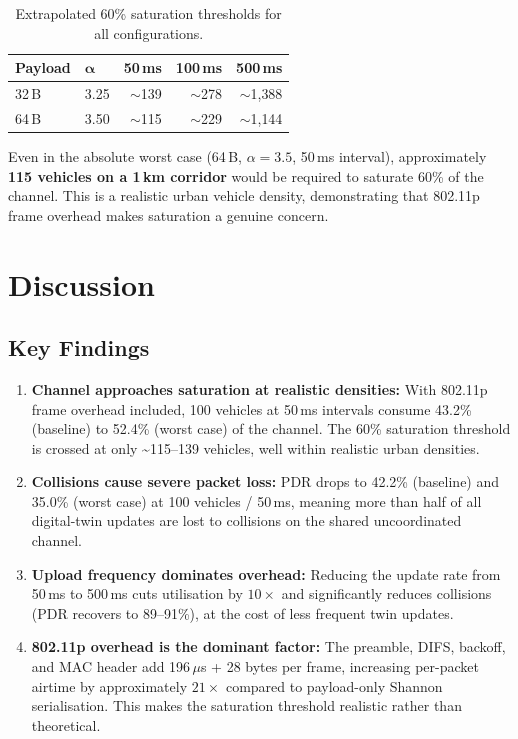 \documentclass[12pt, a4paper]{article}
\begin{document}
\begin{table}[H]
\centering
\caption{Extrapolated 60\% saturation thresholds for all configurations.}
\label{tab:thresholds}
\begin{tabular}{l l r r r}
    \toprule
    \textbf{Payload} & $\boldsymbol{\alpha}$ & \textbf{50\,ms} & \textbf{100\,ms} & \textbf{500\,ms} \\
    \midrule
    32\,B & 3.25 & $\sim$139 & $\sim$278 & $\sim$1{,}388 \\
    64\,B & 3.50 & $\sim$115 & $\sim$229 & $\sim$1{,}144 \\
    \bottomrule
\end{tabular}
\end{table}

Even in the absolute worst case (64\,B, $\alpha = 3.5$, 50\,ms interval),
approximately \textbf{115 vehicles on a 1\,km corridor} would be required
to saturate 60\% of the channel.  This is a realistic urban vehicle density,
demonstrating that 802.11p frame overhead makes saturation a genuine concern.

\section{Discussion}

\subsection{Key Findings}

\begin{enumerate}
    \item \textbf{Channel approaches saturation at realistic densities:}
    With 802.11p frame overhead included, 100 vehicles at 50\,ms intervals
    consume 43.2\% (baseline) to 52.4\% (worst case) of the channel.  The
    60\% saturation threshold is crossed at only \textasciitilde115--139
    vehicles, well within realistic urban densities.

    \item \textbf{Collisions cause severe packet loss:} PDR drops to 42.2\%
    (baseline) and 35.0\% (worst case) at 100 vehicles / 50\,ms, meaning more
    than half of all digital-twin updates are lost to collisions on the shared
    uncoordinated channel.

    \item \textbf{Upload frequency dominates overhead:} Reducing the update
    rate from 50\,ms to 500\,ms cuts utilisation by $10\times$ and
    significantly reduces collisions (PDR recovers to 89--91\%), at the cost
    of less frequent twin updates.

    \item \textbf{802.11p overhead is the dominant factor:} The preamble,
    DIFS, backoff, and MAC header add 196\,$\mu$s + 28 bytes per frame,
    increasing per-packet airtime by approximately $21\times$ compared to
    payload-only Shannon serialisation.  This makes the saturation threshold
    realistic rather than theoretical.
\end{enumerate}
\end{document}
